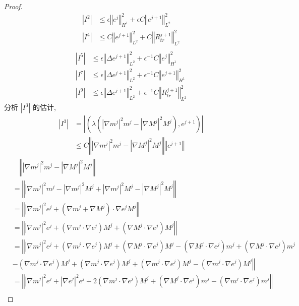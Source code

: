 \documentclass[UTF8,a4paper]{article}
\begin{document}
\begin{proof}
\begin{align*}
  \left| I^2 \right|&\leq \epsilon \left\Vert e^j\right\Vert_{H^1}^2+\epsilon C \left\Vert e^{j+1}\right\Vert_{L^2}^2\\
  \left| I^4 \right|&\leq C \left\Vert e^{j+1}\right\Vert_{L^2}^2+C \left\Vert R_{tr}^{j+1}\right\Vert_{L^2}^2\\
  \end{align*}
\begin{align*}
  \left| I^5 \right|&\leq\epsilon \left\Vert \Delta e^{j+1}\right\Vert_{L^2}^{2}+\epsilon^{-1}C \left\Vert e^j\right\Vert_{H^1}^2\\
  \left| I^7 \right|&\leq \epsilon \left\Vert \Delta e^{j+1}\right\Vert_{L^2}^2+\epsilon^{-1}C \left\Vert e^{j+1}\right\Vert_{H^1}^2\\
  \left| I^9 \right|&\leq \epsilon \left\Vert \Delta e^{j+1}\right\Vert_{L^2}^2+\epsilon^{-1}C \left\Vert R_{tr}^{j+1}\right\Vert_{L^2}^2
\end{align*}
分析 $\left| I^3 \right|$ 的估计,
\begin{align*}
  \left| I^3 \right|&=\left| \left( \lambda(\left| \nabla m^j \right|^2m^j-\left| \nabla M^j \right|^2M^j),e^{j+1}\right) \right|\\
  &\leq C \left\Vert\left| \nabla m^j \right|^2m^j-\left| \nabla M^j \right|^2M^j \right\Vert \left\Vert e^{j+1}\right\Vert
\end{align*}
{\small
\begin{align*}
  &\quad\left\Vert\left| \nabla m^j \right|^2m^j-\left| \nabla M^j \right|^2M^j \right\Vert\\
  &=\left\Vert\left| \nabla m^j \right|^2m^j-\left| \nabla m^j \right|^2M^j+\left| \nabla m^j \right|^2M^j-\left| \nabla M^j \right|^2M^j \right\Vert\\
  &=\left\Vert \left| \nabla m^j \right|^2e^j+(\nabla m^j+\nabla M^j)\cdot\nabla e^j M^j \right\Vert\\
  &=\left\Vert \left| \nabla m^j \right|^2e^j+(\nabla m^j\cdot\nabla e^j) M^j+(\nabla M^j\cdot\nabla e^j) M^j \right\Vert\\
  &=\left\Vert\left| \nabla m^j \right|^2\!e^j\!+(\nabla m^j\cdot\nabla e^j)\! M^j\!+(\nabla M^j\cdot\nabla e^j)\! M^j\!-(\nabla M^j\cdot\nabla e^j)\!m^j\!+(\nabla M^j\cdot\nabla e^j)\!m^j\right.\\
  &\left.-(\nabla m^j\cdot\nabla e^j)M^j+(\nabla m^j\cdot\nabla e^j)M^j+(\nabla m^j\cdot\nabla e^j)M^j-(\nabla m^j\cdot\nabla e^j)M^j\right\Vert\\
  &=\left\Vert \left| \nabla m^j \right|^2\!e^j+\left| \nabla e^j \right| ^2\!e^j+2(\nabla m^j\cdot\nabla e^j)M^j+(\nabla M^j\cdot\nabla e^j)m^j-(\nabla m^j\cdot\nabla e^j)m^j\right\Vert\\

\end{align*}}
\end{proof}
\end{document}
